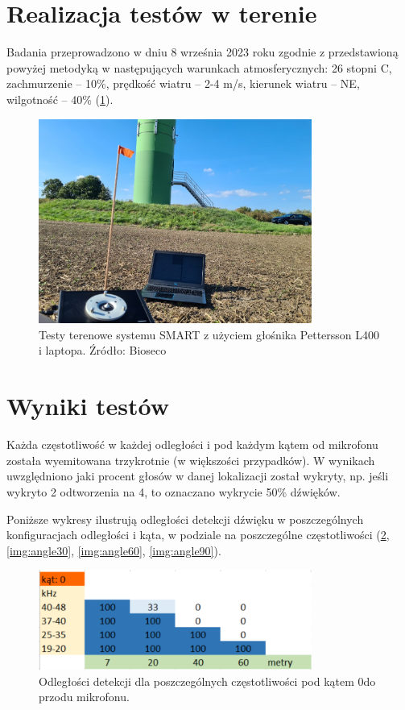 \documentclass{sprz}
\begin{document}
\section{Realizacja testów w terenie}
Badania przeprowadzono w dniu 8 września 2023 roku zgodnie z przedstawioną powyżej metodyką w następujących warunkach atmosferycznych: 26 stopni C, zachmurzenie – 10\%, prędkość wiatru – 2-4 m/s, kierunek wiatru – NE, wilgotność – 40\% (\ref{img:fieldtests}).

\begin{figure}[h]
  \centering
  \includegraphics[width=0.8\textwidth]{sprz/fieldtests.png}
  \caption{Testy terenowe systemu SMART z użyciem głośnika Pettersson L400 i laptopa. Źródło: Bioseco}
  \label{img:fieldtests}
\end{figure}

\section{Wyniki testów}
Każda częstotliwość w każdej odległości i pod każdym kątem od mikrofonu została wyemitowana trzykrotnie (w większości przypadków). W wynikach uwzględniono jaki procent głosów w danej lokalizacji został wykryty, np. jeśli wykryto 2 odtworzenia na 4, to oznaczano wykrycie 50\% dźwięków.

Poniższe wykresy ilustrują odległości detekcji dźwięku w poszczególnych konfiguracjach odległości i kąta, w podziale na poszczególne częstotliwości (\ref{img:angle0}, \ref{img:angle30}, \ref{img:angle60}, \ref{img:angle90}).

  \begin{figure}[h]
    \centering
    \includegraphics[width=0.8\textwidth]{sprz/angle0.png}
    \caption{Odległości detekcji dla poszczególnych częstotliwości pod kątem 0\textdegree do przodu mikrofonu.}
    \label{img:angle0}
  \end{figure}
\clearpage
\end{document}
